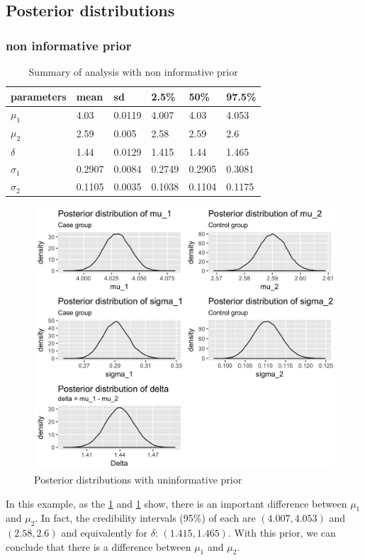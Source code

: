 \documentclass{article}
\begin{document}
\subsection{Posterior distributions}
\subsubsection{non informative prior}
\begin{table}[ht!]
\centering
\caption{Summary of analysis with non informative prior}
\label{tbl:1}
\begin{tabular}{llllll}
\hline
parameters & mean   & sd     & 2.5\%  & 50\%   & 97.5\% \\ \hline
$\mu_1$    & 4.03   & 0.0119 & 4.007  & 4.03   & 4.053  \\
$\mu_2$    & 2.59   & 0.005  & 2.58   & 2.59   & 2.6    \\
$\delta$   & 1.44   & 0.0129 & 1.415  & 1.44   & 1.465  \\
$\sigma_1$ & 0.2907 & 0.0084 & 0.2749 & 0.2905 & 0.3081 \\
$\sigma_2$ & 0.1105 & 0.0035 & 0.1038 & 0.1104 & 0.1175 \\ \hline
\end{tabular}
\end{table}

\begin{figure}[ht!]
  \centering
  \includegraphics[width=.8\textwidth]{imgs/01_posterior_pars.png}
  \caption{Posterior distributions with uninformative prior}
  \label{fig:fig2}
\end{figure}

In this example, as the \cref{fig:fig2} and \cref{tbl:1} show, there is an important difference between $\mu_1$ and $\mu_2$. In fact, the credibility intervals (95\%) of each are $(4.007, 4.053)$ and $(2.58, 2.6)$ and equivalently for $\delta$: $(1.415, 1.465)$. With this prior, we can conclude that there is a difference between $\mu_1$ and $\mu_2$.
\end{document}
